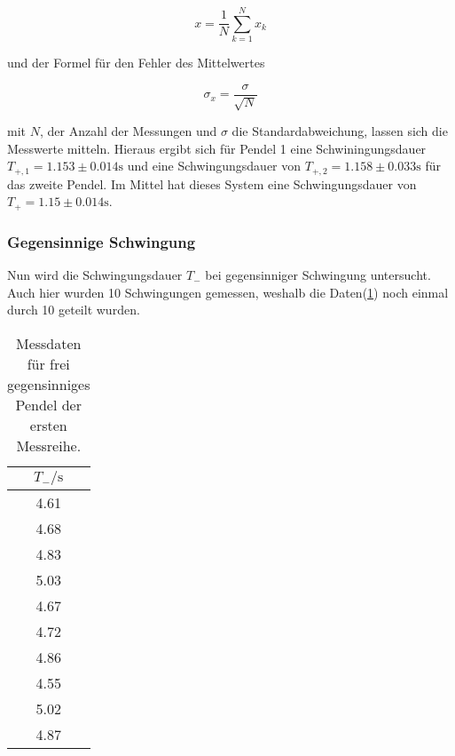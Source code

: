             \begin{equation}
                x = \frac{1}{N} \sum_{k=1}^{N} x_k
                \label{eqn:mittel}
            \end{equation}

            \noindent und der Formel für den Fehler des Mittelwertes

            \begin{equation}
                \sigma_{x} = \frac{\sigma}{\sqrt{N}}
                \label{eqn:mif}
            \end{equation}

            \noindent mit $N$, der Anzahl der Messungen und $\sigma$ die Standardabweichung, lassen sich die Messwerte mitteln. Hieraus ergibt sich für Pendel 1 eine 
            Schwiningungsdauer $T_{+,1} = 1.153 \pm 0.014 \si{\second}$ und eine Schwingungsdauer von 
            $T_{+,2} = 1.158 \pm 0.033 \si{\second}$ für das zweite Pendel. Im Mittel hat dieses System eine Schwingungsdauer von 
            $T_+ = 1.15 \pm 0.014 \si{\second}$.

        \subsubsection{Gegensinnige Schwingung}
            
            \noindent Nun wird die Schwingungsdauer $T_{-}$ bei gegensinniger Schwingung untersucht. Auch hier wurden 10 Schwingungen gemessen, 
            weshalb die Daten(\ref{tab:geg1}) noch einmal durch 10 geteilt wurden.

            \begin{table}[ht]
                \centering
                \caption{Messdaten für frei gegensinniges Pendel der ersten Messreihe.}
                \label{tab:geg1}
                \begin{tabular}{c }
                 \toprule
                 $T_- / \si{\s}$ \\
                 \midrule
                 4.61  \\ 
                 4.68  \\ 
                 4.83  \\ 
                 5.03  \\ 
                 4.67  \\ 
                 4.72  \\ 
                 4.86  \\ 
                 4.55  \\ 
                 5.02  \\ 
                 4.87  \\ 
                \end{tabular}
            \end{table}

